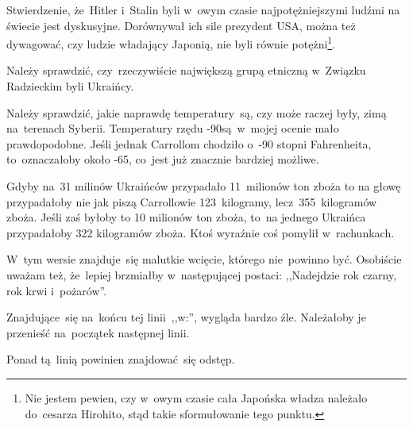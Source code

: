 \documentclass[a4paper,11pt]{article}
\begin{document}
\vspace{\spaceFour}


\start {} Stwierdzenie, że~Hitler i~Stalin byli w~owym czasie
najpotężniejszymi ludźmi na świecie jest dyskusyjne. Dorównywał ich
sile prezydent USA, można też dywagować, czy ludzie władający Japonią,
nie byli równie potężni\footnote{Nie jestem pewien, czy w~owym czasie
  cała Japońska władza należało do~cesarza Hirohito, stąd takie
  sformułowanie tego punktu.}.

\vspace{\spaceFour}


\start {} Należy sprawdzić, czy~rzeczywiście największą grupą
etniczną w~Związku Radzieckim byli Ukraińcy.

\vspace{\spaceFour}


\start {} Należy sprawdzić, jakie naprawdę temperatury~są, czy
może raczej były, zimą na~terenach Syberii. Temperatury rzędu
-90\textcelsius są~w~mojej ocenie mało prawdopodobne. Jeśli jednak
Carrollom chodziło o~-90 stopni Fahrenheita, to~oznaczałoby około
-65\textcelsius, co~jest już znacznie bardziej możliwe.

\vspace{\spaceFour}


 Gdyby na~31 milinów Ukraińców przypadało 11~milionów ton
zboża to na głowę przypadałoby nie jak piszą Carrollowie
123~kilogramy, lecz~355~kilogramów zboża. Jeśli zaś byłoby to 10
milionów ton zboża, to~na jednego Ukraińca przypadałoby 322 kilogramów
zboża. Ktoś wyraźnie coś pomylił w~rachunkach.

\vspace{\spaceFour}


\start {} W~tym wersie znajduje~się malutkie wcięcie,
którego nie~powinno być. Osobiście uważam też, że~lepiej brzmiałby
w~następującej postaci: ,,Nadejdzie rok czarny, rok krwi i~pożarów''.

\vspace{\spaceFour}


\start {} Znajdujące~się na~końcu tej linii~,,w:'',
wygląda bardzo źle. Należałoby je przenieść na~początek następnej
linii.

\vspace{\spaceFour}


\start {} Ponad tą~linią powinien znajdować~się odstęp.

\vspace{\spaceFour}
\end{document}
